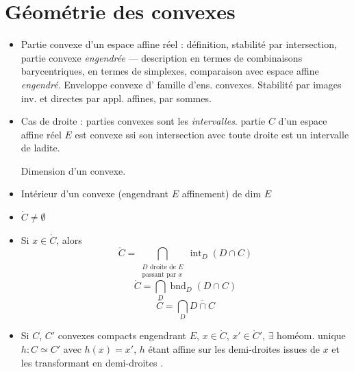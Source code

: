 \documentclass[11pt,a4paper]{article}
\begin{document}
\section{Géométrie des convexes}



\begin{itemize}
  \item Partie convexe d'un espace affine réel : définition, stabilité par
    intersection, partie convexe \emph{engendrée} --- description en termes de
    combinaisons barycentriques, en termes de simplexes, comparaison avec
    espace affine \emph{engendré}. Enveloppe convexe d'
     famille d'ens. convexes. Stabilité par images
    inv. et directes par appl. affines, par sommes.
  \item Cas de  droite : parties convexes sont les
    \emph{intervalles}.  partie  $C$ d'un
     espace affine réel $E$ est convexe ssi son intersection
    avec toute droite est un intervalle de ladite.

    Dimension d'un convexe.
  \item Intérieur d'un convexe (engendrant $E$ affinement)  de
    dim $E$
\end{itemize}

\begin{itemize}
      \item[a)] $\mathring{C} \neq \emptyset$
      \item[b)] Si $x \in \mathring{C}$, alors
        \[
          \mathring{C} = \bigcap_{\substack{D \text{ droite de } E \\ \text{passant par } x}} \operatorname{int}_D (D \cap C)
        \]
        \[
          \dot{C} = \bigcap_D \operatorname{bnd}_D (D \cap C)
        \]
        \[
          \overline{C} = \bigcap_D \overline{D \cap C}
        \]
      \item[c)] Si $C$, $C'$ convexes compacts engendrant $E$, $x \in
        \mathring{C}$, $x' \in \mathring{C}'$, $\exists$ homéom. unique
        $h : C \simeq C'$ avec $h(x) = x'$, $h$ étant 
        affine sur les demi-droites issues de $x$ et les transformant en
        demi-droites .
\end{itemize}
\end{document}
